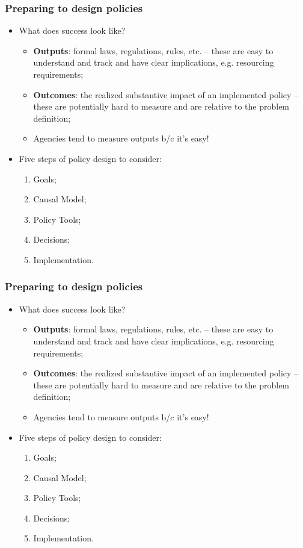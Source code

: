 \documentclass[aspectratio=169]{beamer}
\theoremstyle{principle}
\begin{document}
\begin{frame}
\frametitle{Preparing to design policies}
\begin{itemize}
\item What does success look like?
\begin{itemize}
\item \textbf{Outputs}: \color{white}formal laws, regulations, rules, etc. -- these are easy to understand and track and have clear implications, e.g. resourcing requirements;\color{black}
\item \textbf{Outcomes}: \color{white}the realized substantive impact of an implemented policy -- these are potentially hard to measure and are relative to the problem definition;
\item[] Agencies tend to measure outputs b/c it's easy!\color{black}
\end{itemize}
\bigskip
\item Five steps of policy design to consider:
\begin{enumerate}
\item Goals;
\item Causal Model;
\item Policy Tools;
\item Decisions;
\item Implementation.
\end{enumerate}
\end{itemize}
\end{frame}

\begin{frame}
\frametitle{Preparing to design policies}
\begin{itemize}
\item What does success look like?
\begin{itemize}
\item \textbf{Outputs}: formal laws, regulations, rules, etc. -- these are easy to understand and track and have clear implications, e.g. resourcing requirements;
\item \textbf{Outcomes}: \color{white}the realized substantive impact of an implemented policy -- these are potentially hard to measure and are relative to the problem definition;
\item[] Agencies tend to measure outputs b/c it's easy!\color{black}
\end{itemize}
\bigskip
\item Five steps of policy design to consider:
\begin{enumerate}
\item Goals;
\item Causal Model;
\item Policy Tools;
\item Decisions;
\item Implementation.
\end{enumerate}
\end{itemize}
\end{frame}
\end{document}
